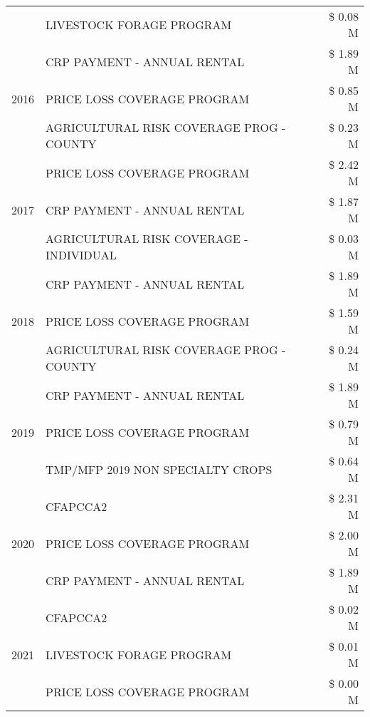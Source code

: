 \begin{tabular}{llr}
 & LIVESTOCK FORAGE PROGRAM & \$ 0.08 M \\
\cline{1-3}
\multirow[t]{3}{*}{2016} & CRP PAYMENT - ANNUAL RENTAL                   & \$ 1.89 M \\
 & PRICE LOSS COVERAGE PROGRAM                   & \$ 0.85 M \\
 & AGRICULTURAL RISK COVERAGE PROG - COUNTY      & \$ 0.23 M \\
\cline{1-3}
\multirow[t]{3}{*}{2017} & PRICE LOSS COVERAGE PROGRAM & \$ 2.42 M \\
 & CRP PAYMENT - ANNUAL RENTAL & \$ 1.87 M \\
 & AGRICULTURAL RISK COVERAGE - INDIVIDUAL & \$ 0.03 M \\
\cline{1-3}
\multirow[t]{3}{*}{2018} & CRP PAYMENT - ANNUAL RENTAL & \$ 1.89 M \\
 & PRICE LOSS COVERAGE PROGRAM & \$ 1.59 M \\
 & AGRICULTURAL RISK COVERAGE PROG - COUNTY & \$ 0.24 M \\
\cline{1-3}
\multirow[t]{3}{*}{2019} & CRP PAYMENT - ANNUAL RENTAL & \$ 1.89 M \\
 & PRICE LOSS COVERAGE PROGRAM & \$ 0.79 M \\
 & TMP/MFP 2019 NON SPECIALTY CROPS & \$ 0.64 M \\
\cline{1-3}
\multirow[t]{3}{*}{2020} & CFAPCCA2 & \$ 2.31 M \\
 & PRICE LOSS COVERAGE PROGRAM & \$ 2.00 M \\
 & CRP PAYMENT - ANNUAL RENTAL & \$ 1.89 M \\
\cline{1-3}
\multirow[t]{3}{*}{2021} & CFAPCCA2 & \$ 0.02 M \\
 & LIVESTOCK FORAGE PROGRAM & \$ 0.01 M \\
 & PRICE LOSS COVERAGE PROGRAM & \$ 0.00 M \\
\cline{1-3}
\bottomrule
\end{tabular}
